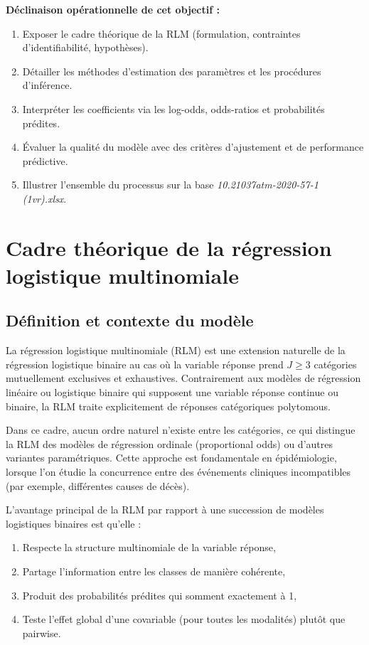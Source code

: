 \documentclass[12pt,a4paper]{article}
\begin{document}
\textbf{Déclinaison opérationnelle de cet objectif :}
\begin{enumerate}[label=\arabic*.]
    \item Exposer le cadre théorique de la RLM (formulation, contraintes d'identifiabilité, hypothèses).
    \item Détailler les méthodes d'estimation des paramètres et les procédures d'inférence.
    \item Interpréter les coefficients via les log-odds, odds-ratios et probabilités prédites.
    \item Évaluer la qualité du modèle avec des critères d'ajustement et de performance prédictive.
    \item Illustrer l'ensemble du processus sur la base \textit{10.21037atm-2020-57-1 (1vr).xlsx}.
\end{enumerate}

\section{Cadre théorique de la régression logistique multinomiale}

\subsection{Définition et contexte du modèle}

La régression logistique multinomiale (RLM) est une extension naturelle de la régression logistique binaire au cas où la variable réponse prend $J \geq 3$ catégories mutuellement exclusives et exhaustives. Contrairement aux modèles de régression linéaire ou logistique binaire qui supposent une variable réponse continue ou binaire, la RLM traite explicitement de réponses catégoriques polytomous.

Dans ce cadre, aucun ordre naturel n'existe entre les catégories, ce qui distingue la RLM des modèles de régression ordinale (proportional odds) ou d'autres variantes paramétriques. Cette approche est fondamentale en épidémiologie, lorsque l'on étudie la concurrence entre des événements cliniques incompatibles (par exemple, différentes causes de décès).

L'avantage principal de la RLM par rapport à une succession de modèles logistiques binaires est qu'elle :
\begin{enumerate}
    \item Respecte la structure multinomiale de la variable réponse,
    \item Partage l'information entre les classes de manière cohérente,
    \item Produit des probabilités prédites qui somment exactement à 1,
    \item Teste l'effet global d'une covariable (pour toutes les modalités) plutôt que pairwise.
\end{enumerate}
\end{document}
